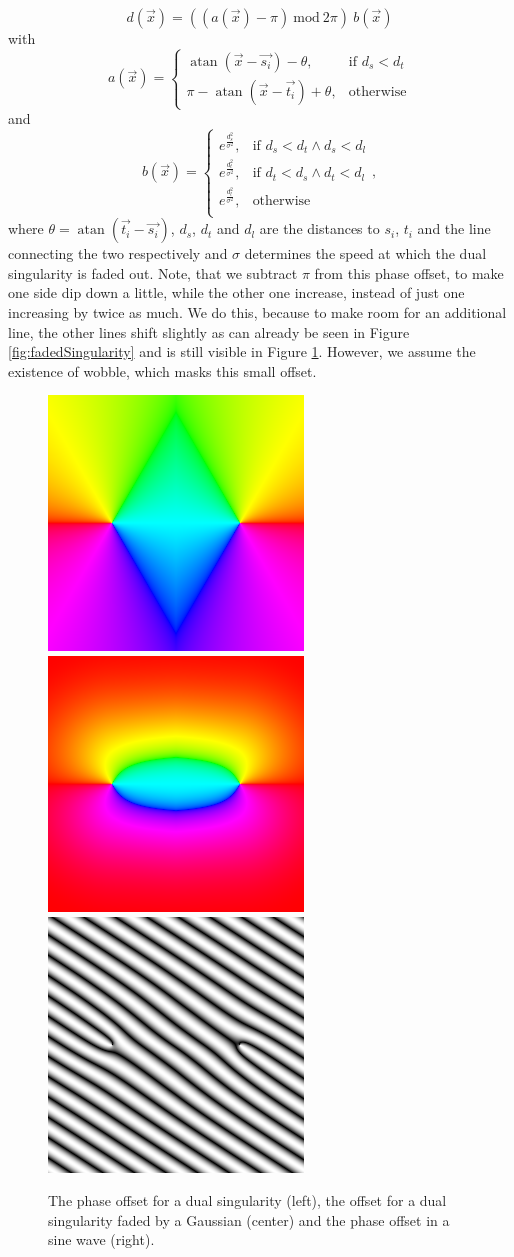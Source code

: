 \documentclass{utue} %
\DeclareMathOperator{\atan}{atan}
\begin{document}
$$
d(\vec{x}) = ((a(\vec{x})-\pi)\ \mathrm{mod}\ 2\pi)\ b(\vec{x})
$$
with
$$
  a(\vec{x}) = \begin{cases}
  \atan(\vec{x}-\vec{s_i}) - \theta, &\text{if }d_s < d_t\\
  \pi - \atan(\vec{x}-\vec{t_i}) + \theta, &\text{otherwise}
  \end{cases}
$$
and
$$
  b(\vec{x}) = \begin{cases}
    e^{\frac{d_s^2}{\sigma^2}}, &\text{if }d_s < d_t \land d_s < d_l\\
    e^{\frac{d_t^2}{\sigma^2}}, &\text{if }d_t < d_s \land d_t < d_l\\
    e^{\frac{d_l^2}{\sigma^2}}, &\text{otherwise}\\
  \end{cases},
$$
where $\theta=\atan(\vec{t_i}-\vec{s_i})$, $d_s$, $d_t$ and $d_l$ are the distances to $s_i$, $t_i$ and the line connecting the two respectively and $\sigma$ determines the speed at which the dual singularity is faded out. Note, that we subtract $\pi$ from this phase offset, to make one side dip down a little, while the other one increase, instead of just one increasing by twice as much. We do this, because to make room for an additional line, the other lines shift slightly as can already be seen in Figure \ref{fig:fadedSingularity} and is still visible in Figure \ref{fig:dualSingularity}. However, we assume the existence of wobble, which masks this small offset.

\begin{figure}[ht]
  \centering
  \includegraphics[width=0.3\linewidth]{images/dualSingularityPhase}
  \includegraphics[width=0.3\linewidth]{images/dualSingularityFaded}
  \includegraphics[width=0.3\linewidth]{images/dualSingularitySineWave}
  \caption{The phase offset for a dual singularity (left), the offset for a dual singularity faded by a Gaussian (center) and the phase offset in a sine wave (right).}\label{fig:dualSingularity}
\end{figure}
\end{document}

